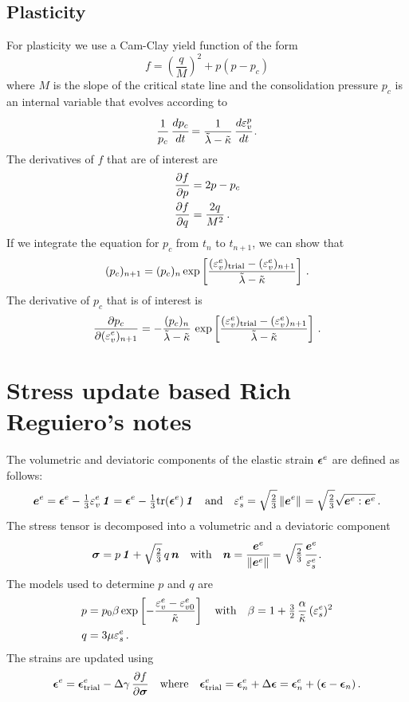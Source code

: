 \subsection{Plasticity}
For plasticity we use a Cam-Clay yield function of the form
\[
   f = \left(\frac{q}{M}\right)^2 + p(p-p_c) 
\]
where $M$ is the slope of the critical state line and the consolidation pressure $p_c$ is an internal variable that 
evolves according to 
\[
   \frac{1}{p_c}\,\cfrac{dp_c}{dt} = \frac{1}{\tilde{\lambda} - \tilde{\kappa}}\,\cfrac{d\varepsilon^p_v}{dt} \,.
\]
The derivatives of $f$ that are of interest are
\[
   \begin{aligned}
     \frac{\displaystyle\partial f}{\displaystyle\partial p} & = 2p - p_c \\
     \frac{\displaystyle\partial f}{\displaystyle\partial q} & = \frac{2q}{M^2} \,.
   \end{aligned}
\]
If we integrate the equation for $p_c$ from $t_{n}$ to $t_{n+1}$, we can show that
\[
   (p_c)_{n+1} = (p_c)_n \exp\left[\frac{(\varepsilon_v^e)_{\text{trial}} - (\varepsilon_v^e)_{n+1}}{\tilde{\lambda} - \tilde{\kappa}}\right] \,.
\]
The derivative of $p_c$ that is of interest is
\[
   \frac{\displaystyle\partial p_c}{\displaystyle\partial (\varepsilon_v^e)_{n+1}} = -\frac{(p_c)_n}{\tilde{\lambda}-\tilde{\kappa}}\,\exp\left[\frac{(\varepsilon^e_v)_{\text{trial}} - (\varepsilon_v^e)_{n+1}}{\tilde{\lambda}-\tilde{\kappa}}\right] \,.
\]

\section{Stress update based Rich Reguiero's notes}
The volumetric and deviatoric components of the elastic strain $\boldsymbol{\epsilon}^e$ are defined
as follows:
\[
   \boldsymbol{e}^e = \boldsymbol{\epsilon}^e - \tfrac{1}{3}\varepsilon^e_v\,\boldsymbol{\mathit{1}} = \boldsymbol{\epsilon}^e - \tfrac{1}{3}\text{tr}(\boldsymbol{\epsilon}^e)\,\boldsymbol{\mathit{1}}
   \quad \text{and} \quad
   \varepsilon^e_s = \sqrt{\tfrac{2}{3}}\left\lVert\boldsymbol{e}^e\right\rVert_{}  = \sqrt{\tfrac{2}{3}}\sqrt{\boldsymbol{e}^e:\boldsymbol{e}^e} \,.
\]
The stress tensor is decomposed into a volumetric and a deviatoric component
\[
   \boldsymbol{\sigma} = p\,\boldsymbol{\mathit{1}} + \sqrt{\tfrac{2}{3}}\, q\, \boldsymbol{n} \quad \text{with} \quad
   \boldsymbol{n} = \cfrac{\boldsymbol{e}^e}{\left\lVert\boldsymbol{e}^e\right\rVert_{}} = \sqrt{\tfrac{2}{3}}\, \cfrac{\boldsymbol{e}^e}{\varepsilon^e_s} \,.
\]
The models used to determine $p$ and $q$ are
\[
  \begin{aligned}
    p &= p_0\beta\exp\left[-\frac{\varepsilon^e_v - \varepsilon^e_{v0}}{\tilde{\kappa}}\right] \quad \text{with} \quad
     \beta = 1 + \tfrac{3}{2}\,\frac{\alpha}{\tilde{\kappa}}\,(\varepsilon^e_s)^2 \\
    q &= 3\mu\varepsilon^e_s \,.
  \end{aligned}
\]
The strains are updated using
\[
  \boldsymbol{\epsilon}^e = \boldsymbol{\epsilon}^e_{\rm trial} - \Delta\gamma\,\frac{\displaystyle\partial f}{\displaystyle\partial \boldsymbol{\sigma}}
  \quad \text{where} \quad \boldsymbol{\epsilon}^e_{\rm trial} = \boldsymbol{\epsilon}^e_n + \Delta\boldsymbol{\epsilon}
     = \boldsymbol{\epsilon}^e_n + (\boldsymbol{\epsilon} - \boldsymbol{\epsilon}_n) \,.
\]


